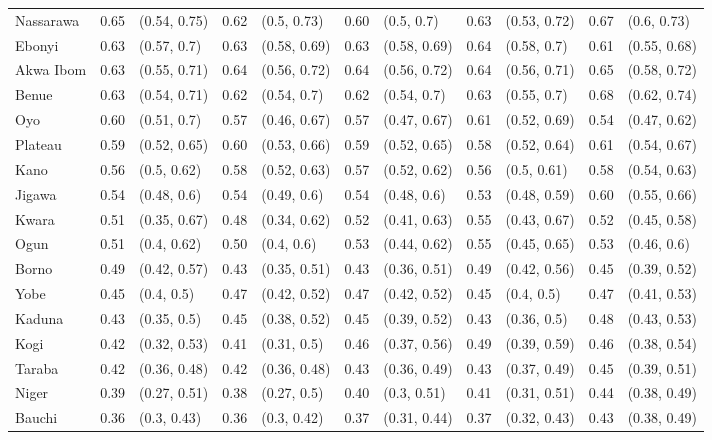 \begin{tabular}{lrlrlrlrlrl}
Nassarawa & 0.65 & (0.54, 0.75) & 0.62 & (0.5, 0.73) & 0.60 & (0.5, 0.7) & 0.63 & (0.53, 0.72) & 0.67 & (0.6, 0.73)\\
Ebonyi & 0.63 & (0.57, 0.7) & 0.63 & (0.58, 0.69) & 0.63 & (0.58, 0.69) & 0.64 & (0.58, 0.7) & 0.61 & (0.55, 0.68)\\
Akwa Ibom & 0.63 & (0.55, 0.71) & 0.64 & (0.56, 0.72) & 0.64 & (0.56, 0.72) & 0.64 & (0.56, 0.71) & 0.65 & (0.58, 0.72)\\
Benue & 0.63 & (0.54, 0.71) & 0.62 & (0.54, 0.7) & 0.62 & (0.54, 0.7) & 0.63 & (0.55, 0.7) & 0.68 & (0.62, 0.74)\\
Oyo & 0.60 & (0.51, 0.7) & 0.57 & (0.46, 0.67) & 0.57 & (0.47, 0.67) & 0.61 & (0.52, 0.69) & 0.54 & (0.47, 0.62)\\
Plateau & 0.59 & (0.52, 0.65) & 0.60 & (0.53, 0.66) & 0.59 & (0.52, 0.65) & 0.58 & (0.52, 0.64) & 0.61 & (0.54, 0.67)\\
Kano & 0.56 & (0.5, 0.62) & 0.58 & (0.52, 0.63) & 0.57 & (0.52, 0.62) & 0.56 & (0.5, 0.61) & 0.58 & (0.54, 0.63)\\
Jigawa & 0.54 & (0.48, 0.6) & 0.54 & (0.49, 0.6) & 0.54 & (0.48, 0.6) & 0.53 & (0.48, 0.59) & 0.60 & (0.55, 0.66)\\
Kwara & 0.51 & (0.35, 0.67) & 0.48 & (0.34, 0.62) & 0.52 & (0.41, 0.63) & 0.55 & (0.43, 0.67) & 0.52 & (0.45, 0.58)\\
Ogun & 0.51 & (0.4, 0.62) & 0.50 & (0.4, 0.6) & 0.53 & (0.44, 0.62) & 0.55 & (0.45, 0.65) & 0.53 & (0.46, 0.6)\\
Borno & 0.49 & (0.42, 0.57) & 0.43 & (0.35, 0.51) & 0.43 & (0.36, 0.51) & 0.49 & (0.42, 0.56) & 0.45 & (0.39, 0.52)\\
Yobe & 0.45 & (0.4, 0.5) & 0.47 & (0.42, 0.52) & 0.47 & (0.42, 0.52) & 0.45 & (0.4, 0.5) & 0.47 & (0.41, 0.53)\\
Kaduna & 0.43 & (0.35, 0.5) & 0.45 & (0.38, 0.52) & 0.45 & (0.39, 0.52) & 0.43 & (0.36, 0.5) & 0.48 & (0.43, 0.53)\\
Kogi & 0.42 & (0.32, 0.53) & 0.41 & (0.31, 0.5) & 0.46 & (0.37, 0.56) & 0.49 & (0.39, 0.59) & 0.46 & (0.38, 0.54)\\
Taraba & 0.42 & (0.36, 0.48) & 0.42 & (0.36, 0.48) & 0.43 & (0.36, 0.49) & 0.43 & (0.37, 0.49) & 0.45 & (0.39, 0.51)\\
Niger & 0.39 & (0.27, 0.51) & 0.38 & (0.27, 0.5) & 0.40 & (0.3, 0.51) & 0.41 & (0.31, 0.51) & 0.44 & (0.38, 0.49)\\
Bauchi & 0.36 & (0.3, 0.43) & 0.36 & (0.3, 0.42) & 0.37 & (0.31, 0.44) & 0.37 & (0.32, 0.43) & 0.43 & (0.38, 0.49)\\

\end{tabular}
